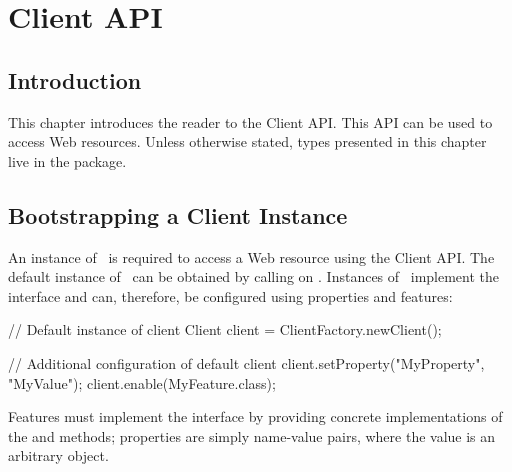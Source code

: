 \chapter{Client API}
\label{client_api}

\section{Introduction}
\label{introduction}

This chapter introduces the reader to the Client API. This API can be used to access Web resources. Unless otherwise stated, types presented in this chapter live in the  package.



\section{Bootstrapping a Client Instance}

An instance of \Client\ is required to access a Web resource using the Client API. The default instance of \Client\ can be obtained by calling  on \ClientFactory. Instances of \Client\ implement the  interface and can, therefore, be configured using properties and features:

\begin{listing}{1}
// Default instance of client
Client client = ClientFactory.newClient();

// Additional configuration of default client
client.setProperty("MyProperty", "MyValue");
client.enable(MyFeature.class);
\end{listing}

Features must implement the  interface by providing concrete implementations of the  and  methods; properties are simply name-value pairs, where the value is an arbitrary object.

